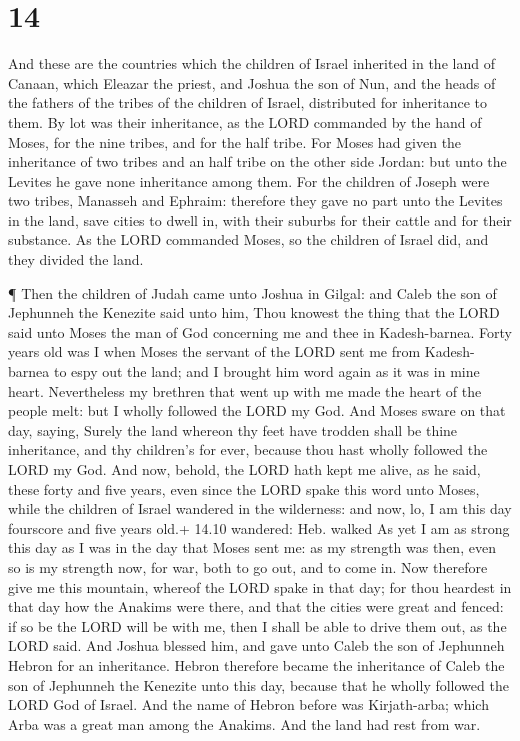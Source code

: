 \hypertarget{section-13}{%
\section{14}\label{section-13}}

 And these are the countries which the children of Israel
inherited in the land of Canaan, which Eleazar the priest, and Joshua
the son of Nun, and the heads of the fathers of the tribes of the
children of Israel, distributed for inheritance to them.  By
lot was their inheritance, as the LORD commanded by the hand of Moses,
for the nine tribes, and for the half tribe.  For Moses had
given the inheritance of two tribes and an half tribe on the other side
Jordan: but unto the Levites he gave none inheritance among them.
 For the children of Joseph were two tribes, Manasseh and
Ephraim: therefore they gave no part unto the Levites in the land, save
cities to dwell in, with their suburbs for their cattle and for their
substance.  As the LORD commanded Moses, so the children of
Israel did, and they divided the land.

 ¶ Then the children of Judah came unto Joshua in Gilgal:
and Caleb the son of Jephunneh the Kenezite said unto him, Thou knowest
the thing that the LORD said unto Moses the man of God concerning me and
thee in Kadesh-barnea.  Forty years old was I when Moses the
servant of the LORD sent me from Kadesh-barnea to espy out the land; and
I brought him word again as it was in mine heart. 
Nevertheless my brethren that went up with me made the heart of the
people melt: but I wholly followed the LORD my God.  And
Moses sware on that day, saying, Surely the land whereon thy feet have
trodden shall be thine inheritance, and thy children's for ever, because
thou hast wholly followed the LORD my God.  And now,
behold, the LORD hath kept me alive, as he said, these forty and five
years, even since the LORD spake this word unto Moses, while the
children of Israel wandered in the wilderness: and now, lo, I am this
day fourscore and five years old.+ 14.10 wandered: Heb. walked
 As yet I am as strong this day as I was in the day that
Moses sent me: as my strength was then, even so is my strength now, for
war, both to go out, and to come in.  Now therefore give me
this mountain, whereof the LORD spake in that day; for thou heardest in
that day how the Anakims were there, and that the cities were great and
fenced: if so be the LORD will be with me, then I shall be able to drive
them out, as the LORD said.  And Joshua blessed him, and
gave unto Caleb the son of Jephunneh Hebron for an inheritance.
 Hebron therefore became the inheritance of Caleb the son
of Jephunneh the Kenezite unto this day, because that he wholly followed
the LORD God of Israel.  And the name of Hebron before was
Kirjath-arba; which Arba was a great man among the Anakims. And the land
had rest from war.

